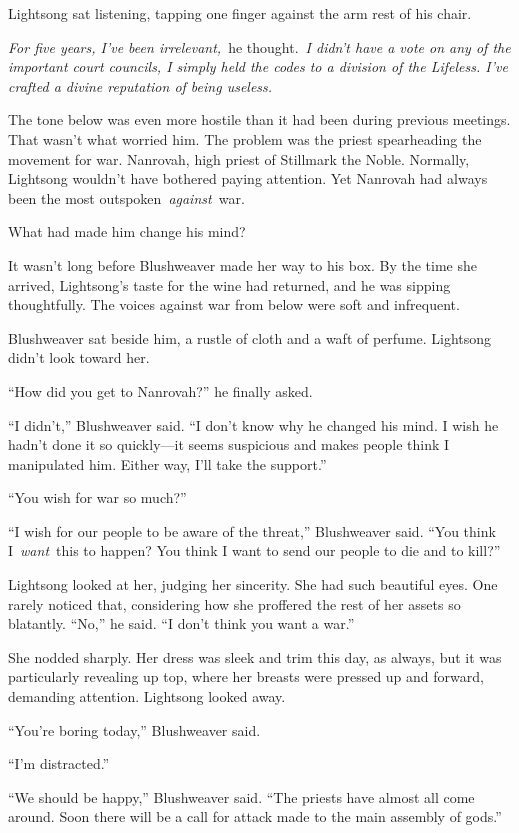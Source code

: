 Lightsong sat listening, tapping one finger against the arm rest of his chair.

\textit{For five years, I’ve been irrelevant,}~he thought.~\textit{I didn’t have a vote on any of the important court councils, I simply held the codes to a division of the Lifeless. I’ve crafted a divine reputation of being useless.}

The tone below was even more hostile than it had been during previous meetings. That wasn’t what worried him. The problem was the priest spearheading the movement for war. Nanrovah, high priest of Stillmark the Noble. Normally, Lightsong wouldn’t have bothered paying attention. Yet Nanrovah had always been the most outspoken~\textit{against}~war.

What had made him change his mind?

It wasn’t long before Blushweaver made her way to his box. By the time she arrived, Lightsong’s taste for the wine had returned, and he was sipping thoughtfully. The voices against war from below were soft and infrequent.

Blushweaver sat beside him, a rustle of cloth and a waft of perfume. Lightsong didn’t look toward her.

“How did you get to Nanrovah?” he finally asked.

“I didn’t,” Blushweaver said. “I don’t know why he changed his mind. I wish he hadn’t done it so quickly—it seems suspicious and makes people think I manipulated him. Either way, I’ll take the support.”

“You wish for war so much?”

“I wish for our people to be aware of the threat,” Blushweaver said. “You think I~\textit{want}~this to happen? You think I want to send our people to die and to kill?”

Lightsong looked at her, judging her sincerity. She had such beautiful eyes. One rarely noticed that, considering how she proffered the rest of her assets so blatantly. “No,” he said. “I don’t think you want a war.”

She nodded sharply. Her dress was sleek and trim this day, as always, but it was particularly revealing up top, where her breasts were pressed up and forward, demanding attention. Lightsong looked away.

“You’re boring today,” Blushweaver said.

“I’m distracted.”

“We should be happy,” Blushweaver said. “The priests have almost all come around. Soon there will be a call for attack made to the main assembly of gods.”

